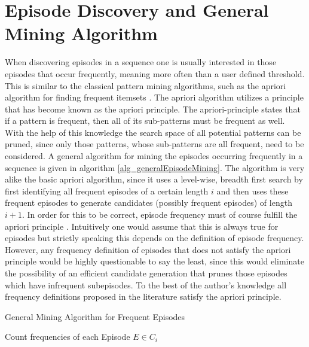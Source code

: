 \section{Episode Discovery and General Mining Algorithm}
\label{sec_episodeDiscovery}
When discovering episodes in a sequence one is usually interested in those episodes that occur frequently, meaning more often than a user defined threshold. This is similar to the classical pattern mining algorithms, such as the apriori algorithm for finding frequent itemsets \cite{agrawal1994fast}. The apriori algorithm utilizes a principle that has become known as the apriori principle. The apriori-principle states that if a pattern is frequent, then all of its sub-patterns must be frequent as well. With the help of this knowledge the search space of all potential patterns can be pruned, since only those patterns, whose sub-patterns are all frequent, need to be considered. A general algorithm for mining the episodes occurring frequently in a sequence is given in algorithm \ref{alg_generalEpisodeMining}. The algorithm is very alike the basic apriori algorithm, since it uses a level-wise, breadth first search by first identifying all frequent episodes of a certain length $i$ and then uses these frequent episodes to generate candidates (possibly frequent episodes) of length $i+1$. In order for this to be correct, episode frequency must of course fulfill the apriori principle \cite{agrawal1994fast}. Intuitively one would assume that this is always true for episodes but strictly speaking this depends on the definition of episode frequency. However, any frequency definition of episodes that does not satisfy the apriori principle would be highly questionable to say the least, since this would eliminate the possibility of an efficient candidate generation that prunes those episodes which have infrequent subepisodes. To the best of the author's knowledge all frequency definitions proposed in the literature satisfy the apriori principle.\newline

\begin{algorithm}[H]
  \caption{General Mining Algorithm for Frequent Episodes
    \label{alg_generalEpisodeMining}}
  \begin{algorithmic}[1]
    \Statex
      	\State Count frequencies of each Episode $E \in C_i$
      \EndWhile
      \State {}
    \EndFunction
  \end{algorithmic}
\end{algorithm}


